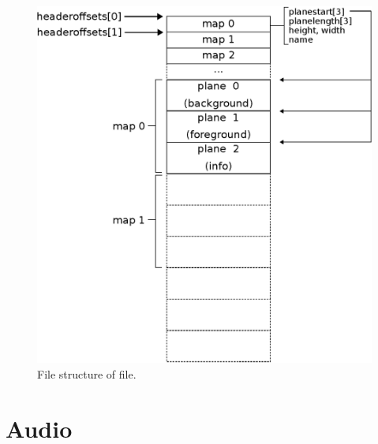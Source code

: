 \documentclass[book.tex]{subfiles}
\begin{document}
\par
\begin{minipage}{\textwidth}
 \par
 \end{minipage}
 
\par
\begin{figure}[H]
\centering
 \includegraphics[width=\textwidth]{imgs/drawings/kdreams_map.eps}
 \caption{File structure of  file.}
 \label{fig:map-file}
\end{figure}

\section{Audio}
\end{document}
